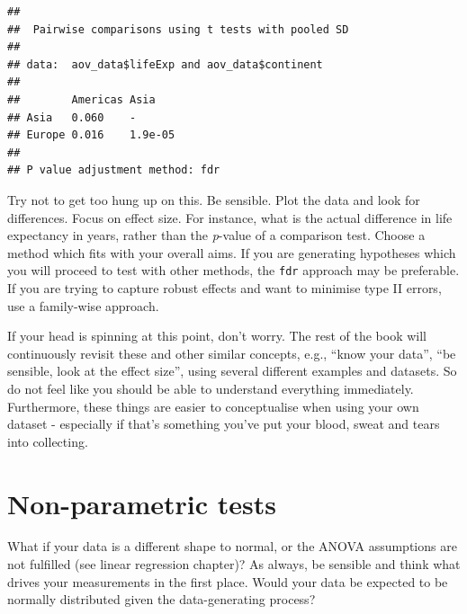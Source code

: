 \documentclass[
  12pt,
  krantz2]{krantz}
\makeatletter
\newenvironment{Shaded}{\begin{snugshade}}{\end{snugshade}}
\newcommand{\DataTypeTok}[1]{\textcolor[rgb]{0.13,0.29,0.53}{#1}}
\newcommand{\KeywordTok}[1]{\textcolor[rgb]{0.13,0.29,0.53}{\textbf{#1}}}
\newcommand{\NormalTok}[1]{#1}
\newcommand{\OperatorTok}[1]{\textcolor[rgb]{0.81,0.36,0.00}{\textbf{#1}}}
\newcommand{\StringTok}[1]{\textcolor[rgb]{0.31,0.60,0.02}{#1}}
\newenvironment{kframe}{%
\medskip{}
\setlength{\fboxsep}{.8em}
 \def\at@end@of@kframe{}%
 \ifinner\ifhmode%
  \def\at@end@of@kframe{\end{minipage}}%
  \begin{minipage}{\columnwidth}%
 \fi\fi%
 \def\FrameCommand##1{\hskip\@totalleftmargin \hskip-\fboxsep
 \colorbox{shadecolor}{##1}\hskip-\fboxsep
     \hskip-\linewidth \hskip-\@totalleftmargin \hskip\columnwidth}%
 \MakeFramed {\advance\hsize-\width
   \@totalleftmargin\z@ \linewidth\hsize
   \@setminipage}}%
 {\par\unskip\endMakeFramed%
 \at@end@of@kframe}
\renewenvironment{Shaded}{\begin{kframe}}{\end{kframe}}
\makeatother
\begin{document}
\begin{Shaded}
\end{Shaded}

\begin{verbatim}
## 
##  Pairwise comparisons using t tests with pooled SD 
## 
## data:  aov_data$lifeExp and aov_data$continent 
## 
##        Americas Asia   
## Asia   0.060    -      
## Europe 0.016    1.9e-05
## 
## P value adjustment method: fdr
\end{verbatim}


Try not to get too hung up on this.
Be sensible.
Plot the data and look for differences.
Focus on effect size.
For instance, what is the actual difference in life expectancy in years, rather than the \emph{p}-value of a comparison test.
Choose a method which fits with your overall aims.
If you are generating hypotheses which you will proceed to test with other methods, the \texttt{fdr} approach may be preferable.
If you are trying to capture robust effects and want to minimise type II errors, use a family-wise approach.

If your head is spinning at this point, don't worry.
The rest of the book will continuously revisit these and other similar concepts, e.g., ``know your data'', ``be sensible, look at the effect size'', using several different examples and datasets.
So do not feel like you should be able to understand everything immediately.
Furthermore, these things are easier to conceptualise when using your own dataset - especially if that's something you've put your blood, sweat and tears into collecting.

\hypertarget{chap06-non-param-tests}{%
\section{Non-parametric tests}\label{chap06-non-param-tests}}


What if your data is a different shape to normal, or the ANOVA assumptions are not fulfilled (see linear regression chapter)?
As always, be sensible and think what drives your measurements in the first place.
Would your data be expected to be normally distributed given the data-generating process?
\end{document}
